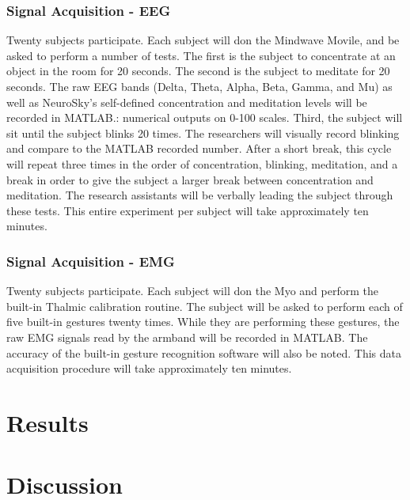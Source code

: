 \documentclass[journal]{IEEEtran}
\begin{document}
\subsubsection{Signal Acquisition - EEG}
Twenty subjects participate. Each subject will don the Mindwave Movile, and be asked to perform a number of tests. The first is the subject to concentrate at an object in the room for 20 seconds. The second is the subject to meditate for 20 seconds. The raw EEG bands (Delta, Theta, Alpha, Beta, Gamma, and Mu) as well as NeuroSky’s self-defined concentration and meditation levels will be recorded in MATLAB.: numerical outputs on 0-100 scales. Third, the subject will sit until the subject blinks 20 times. The researchers will visually record blinking and compare to the MATLAB recorded number. After a short break, this cycle will repeat three times in the order of concentration, blinking, meditation, and a break in order to give the subject a larger break between concentration and meditation. The research assistants will be verbally leading the subject through these tests. This entire experiment per subject will take approximately ten minutes.

\subsubsection{Signal Acquisition - EMG}
Twenty subjects participate. Each subject will don the Myo and perform the built-in Thalmic calibration routine. The subject will be asked to perform each of five built-in gestures twenty times. While they are performing these gestures, the raw EMG signals read by the armband will be recorded in MATLAB. The accuracy of the built-in gesture recognition software will also be noted. This data acquisition procedure will take approximately ten minutes.



\section{Results}

\section{Discussion}
\subsection{}


\end{document}
